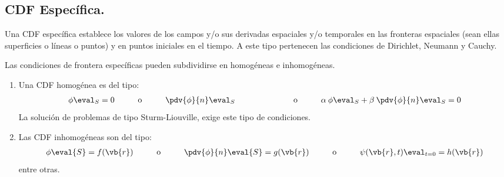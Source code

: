 \subsection*{CDF Específica.}
Una CDF específica establece los valores de los campos y/o sus derivadas espaciales y/o temporales en las fronteras espaciales (sean ellas superficies o líneas o puntos) y en puntos iniciales en el tiempo. A este tipo pertenecen las condiciones de Dirichlet, Neumann y Cauchy.
\par
Las condiciones de frontera específicas pueden subdividirse en homogéneas e inhomogéneas.
\begin{enumerate}
\item  Una CDF homogénea es del tipo:
\begin{align*}
\phi \eval_{S} = 0 \hspace{1cm} \mbox{o} \hspace{1cm} \pdv{\phi}{n} \eval_{S} \hspace{1.5cm} \hspace{1cm} \mbox{o} \hspace{1cm} \alpha \: \phi \eval_{S} + \beta \: \pdv{\phi}{n} \eval_{S} = 0
\end{align*}
La solución de problemas de tipo Sturm-Liouville, exige este tipo de condiciones.
\item Las CDF inhomogéneas son del tipo:
\begin{align*}
\phi \eval{S} = f(\vb{r}) \hspace{1cm} \mbox{o} \hspace{1cm}\pdv{\phi}{n} \eval{S} = g(\vb{r})\hspace{1cm} \mbox{o} \hspace{1cm} \psi(\vb{r}, t) \eval_{t=0} = h(\vb{r})
\end{align*}
entre otras.
\end{enumerate}
